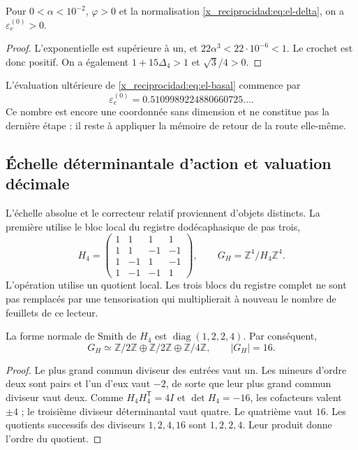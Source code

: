\begin{proposition}
Pour \(0<\alpha<10^{-2}\), \(\varphi>0\) et la normalisation \eqref{x_reciprocidad:eq:el-delta}, on a \(\varepsilon_e^{(0)}>0\).
\end{proposition}
\begin{proof}
L'exponentielle est supérieure à un, et
\(22\alpha^3<22\cdot10^{-6}<1\). Le crochet est donc positif.
On a également \(1+15\Delta_4>1\) et \(\sqrt3/4>0\).
\end{proof}

L'évaluation ultérieure de \eqref{x_reciprocidad:eq:el-basal} commence par
\[
 \varepsilon_e^{(0)}=0.5109989224880660725\ldots.
\]
Ce nombre est encore une coordonnée sans dimension et ne constitue pas la dernière étape : il reste à appliquer la mémoire de retour de la route elle-même.

\subsection{Échelle déterminantale d'action et valuation décimale}

L'échelle absolue et le correcteur relatif proviennent d'objets
distincts. La première utilise le bloc local du registre dodécaphasique
de pas trois,
\begin{equation}
 H_4=\begin{pmatrix}
 1&1&1&1\\1&1&-1&-1\\1&-1&1&-1\\1&-1&-1&1
 \end{pmatrix},\qquad
 G_H=\mathbb Z^4/H_4\mathbb Z^4.
 \label{x_reciprocidad:eq:el-h4}
\end{equation}
L'opération utilise un quotient local. Les trois blocs du registre
complet ne sont pas remplacés par une tensorisation qui multiplierait à
nouveau le nombre de feuillets de ce lecteur.

\begin{lemma}
La forme normale de Smith de \(H_4\) est
\(\operatorname{diag}(1,2,2,4)\). Par conséquent,
\[
 G_H\simeq\mathbb Z/2\mathbb Z\oplus\mathbb Z/2\mathbb Z
 \oplus\mathbb Z/4\mathbb Z,\qquad |G_H|=16.
\]
\end{lemma}
\begin{proof}
Le plus grand commun diviseur des entrées vaut un. Les mineurs d'ordre deux
sont pairs et l'un d'eux vaut \(-2\), de sorte que leur plus grand commun diviseur
vaut deux. Comme \(H_4H_4^{\mathsf T}=4I\) et \(\det H_4=-16\), les
cofacteurs valent \(\pm4\) ; le troisième diviseur déterminantal vaut quatre.
Le quatrième vaut \(16\). Les quotients successifs des diviseurs
\(1,2,4,16\) sont \(1,2,2,4\). Leur produit donne l'ordre du quotient.
\end{proof}

